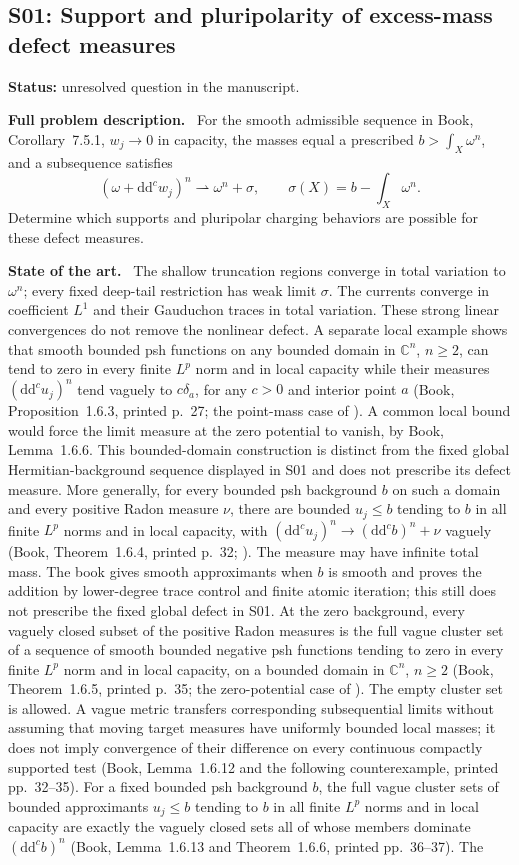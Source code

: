 \documentclass[11pt]{article}
\newcommand{\ddc}{\mathrm d\mathrm d^c}
\newcommand{\field}[1]{\par\medskip\noindent\textbf{#1.}\ }
\begin{document}
\subsection{S01: Support and pluripolarity of excess-mass defect measures}
\label{S01}
\noindent\textbf{Status:} unresolved question in the manuscript.
\field{Full problem description} For the smooth admissible sequence in Book, Corollary~7.5.1, $w_j\to0$ in capacity, the masses equal a prescribed $b>\int_X\omega^n$, and a subsequence satisfies
\[(\omega+\ddc w_j)^n\rightharpoonup\omega^n+\sigma,\qquad
 \sigma(X)=b-\int_X\omega^n.\]
Determine which supports and pluripolar charging behaviors are possible for these defect measures.
\field{State of the art} The shallow truncation regions converge in total variation to $\omega^n$; every fixed deep-tail restriction has weak limit $\sigma$. The currents converge in coefficient $L^1$ and their Gauduchon traces in total variation. These strong linear convergences do not remove the nonlinear defect. A separate local example shows that smooth bounded psh functions on any bounded domain in $\mathbb C^n$, $n\geq2$, can tend to zero in every finite $L^p$ norm and in local capacity while their measures $(\ddc u_j)^n$ tend vaguely to $c\delta_a$, for any $c>0$ and interior point $a$ (Book, Proposition~1.6.3, printed p.~27; the point-mass case of \cite[v1, Corollary 3.6, p.~14]{QinLimits26}). A common local bound would force the limit measure at the zero potential to vanish, by Book, Lemma~1.6.6. This bounded-domain construction is distinct from the fixed global Hermitian-background sequence displayed in S01 and does not prescribe its defect measure. More generally, for every bounded psh background $b$ on such a domain and every positive Radon measure $\nu$, there are bounded $u_j\leq b$ tending to $b$ in all finite $L^p$ norms and in local capacity, with $(\ddc u_j)^n\to(\ddc b)^n+\nu$ vaguely (Book, Theorem~1.6.4, printed p.~32; \cite[v1, Theorem B, p.~3]{QinLimits26}). The measure may have infinite total mass. The book gives smooth approximants when $b$ is smooth and proves the addition by lower-degree trace control and finite atomic iteration; this still does not prescribe the fixed global defect in S01. At the zero background, every vaguely closed subset of the positive Radon measures is the full vague cluster set of a sequence of smooth bounded negative psh functions tending to zero in every finite $L^p$ norm and in local capacity, on a bounded domain in $\mathbb C^n$, $n\geq2$ (Book, Theorem~1.6.5, printed p.~35; the zero-potential case of \cite[v1, Theorem A, pp.~2--3]{QinLimits26}). The empty cluster set is allowed. A vague metric transfers corresponding subsequential limits without assuming that moving target measures have uniformly bounded local masses; it does not imply convergence of their difference on every continuous compactly supported test (Book, Lemma~1.6.12 and the following counterexample, printed pp.~32--35). For a fixed bounded psh background $b$, the full vague cluster sets of bounded approximants $u_j\leq b$ tending to $b$ in all finite $L^p$ norms and in local capacity are exactly the vaguely closed sets all of whose members dominate $(\ddc b)^n$ (Book, Lemma~1.6.13 and Theorem~1.6.6, printed pp.~36--37). The 
\end{document}

